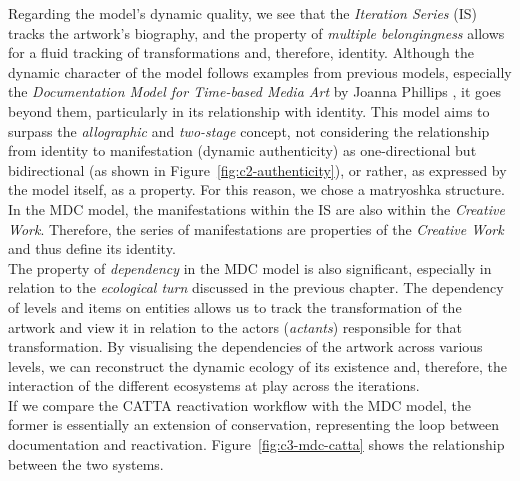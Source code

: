 Regarding the model’s dynamic quality, we see that the \textit{Iteration Series} (IS) tracks the artwork’s biography, and the property of \textit{multiple belongingness} allows for a fluid tracking of transformations and, therefore, identity. Although the dynamic character of the model follows examples from previous models, especially the \textit{Documentation Model for Time-based Media Art} by Joanna Phillips \cite{phillips2015reporting}, it goes beyond them, particularly in its relationship with identity. This model aims to surpass the \textit{allographic} and \textit{two-stage} concept, not considering the relationship from identity to manifestation (dynamic authenticity) as one-directional but bidirectional (as shown in Figure~\ref{fig:c2-authenticity}), or rather, as expressed by the model itself, as a property. For this reason, we chose a matryoshka structure. In the MDC model, the manifestations within the IS are also within the \textit{Creative Work}. Therefore, the series of manifestations are properties of the \textit{Creative Work} and thus define its identity.\\
The property of \textit{dependency} in the MDC model is also significant, especially in relation to the \textit{ecological turn} discussed in the previous chapter. The dependency of levels and items on entities allows us to track the transformation of the artwork and view it in relation to the actors (\textit{actants}) responsible for that transformation. By visualising the dependencies of the artwork across various levels, we can reconstruct the dynamic ecology of its existence and, therefore, the interaction of the different ecosystems at play across the iterations.\\
If we compare the CATTA reactivation workflow with the MDC model, the former is essentially an extension of conservation, representing the loop between documentation and reactivation. Figure~\ref{fig:c3-mdc-catta} shows the relationship between the two systems.

